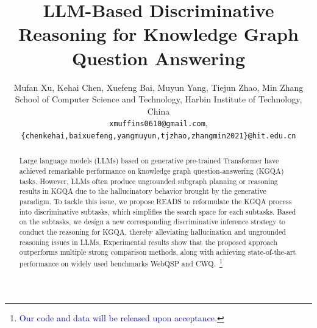\documentclass[11pt]{article}
\title{LLM-Based Discriminative Reasoning for Knowledge Graph Question Answering}
\author{Mufan Xu, Kehai Chen, Xuefeng Bai, Muyun Yang, Tiejun Zhao, Min Zhang\\
  School of Computer Science and Technology, Harbin Institute of Technology, China \\
  \texttt{xmuffins0610@gmail.com},\\  \texttt{\{chenkehai,baixuefeng,yangmuyun,tjzhao,zhangmin2021\}@hit.edu.cn}}
\begin{document}
\maketitle
\begin{abstract}
Large language models (LLMs) based on generative pre-trained Transformer have achieved remarkable performance on knowledge graph question-answering (KGQA) tasks. 
However, LLMs often produce ungrounded subgraph planning or reasoning results in KGQA due to the hallucinatory behavior brought by the generative paradigm.
To tackle this issue, we propose READS to reformulate the KGQA process into discriminative subtasks, which simplifies the search space for each subtasks.
Based on the subtasks, we design a new corresponding discriminative inference strategy to conduct the reasoning for KGQA, thereby alleviating hallucination and ungrounded reasoning issues in LLMs.
Experimental results show that the proposed approach outperforms multiple strong comparison methods, along with achieving state-of-the-art performance on widely used benchmarks WebQSP and CWQ.~\footnote{\textcolor{blue}{Our code and data will be released upon acceptance.}}


\end{abstract}
\end{document}
